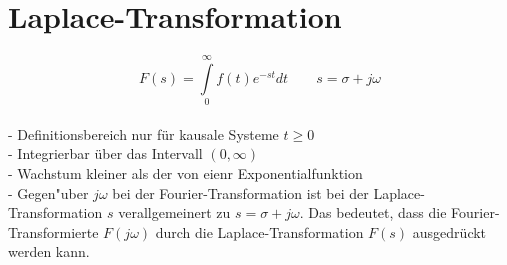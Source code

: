 \section{Laplace-Transformation}
	$$\boxed{F(s)=\int\limits_0^\infty f(t)e^{-st}dt} \qquad s=\sigma+j\omega$$\\
	- Definitionsbereich nur für kausale Systeme $t\geq 0$\\
	- Integrierbar über das Intervall $(0,\infty)$\\
	- Wachstum kleiner als der von eienr Exponentialfunktion\\ 
	- Gegen"uber $j\omega$ bei der Fourier-Transformation ist bei der
	Laplace-Transformation $s$ verallgemeinert zu $s=\sigma + j\omega$. Das
	bedeutet, dass die Fourier-Transformierte $F(j\omega)$ durch die
	Laplace-Transformation $F(s)$ ausgedr\"uckt werden kann.  	
  
